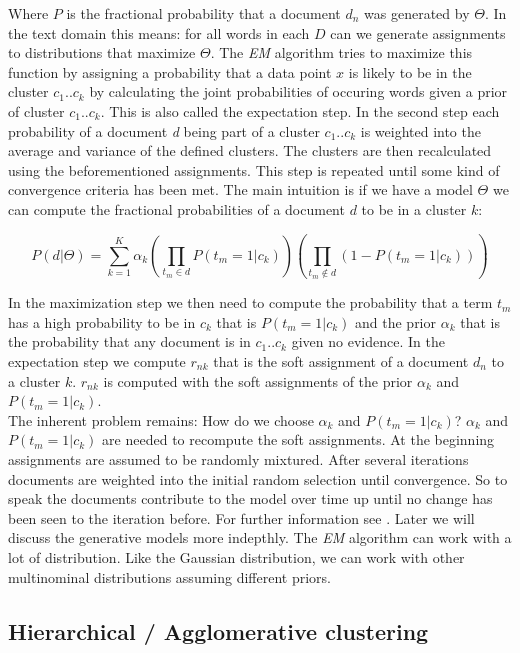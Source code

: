     Where $P$ is the fractional probability that a document $d_n$ was generated by $\Theta$. In the text domain this means: for all words in each $D$ can we generate assignments to distributions that maximize $\Theta$.
    The \emph{EM} algorithm tries to maximize this function by assigning a probability that a data point $x$ is likely to be in the cluster $c_1..c_k$ by calculating the joint probabilities of occuring words given a prior of cluster $c_1..c_k$. This is also called the expectation step. In the second step each probability of a document \emph{d} being part of a cluster $c_1..c_k$ is weighted into the average and variance of the defined clusters. The clusters are then recalculated using the beforementioned assignments. This step is repeated until some kind of convergence criteria has been met. The main intuition is if we have a model $\Theta$ we can compute the fractional probabilities of a document $d$ to be in a cluster $k$:

      \begin{equation}
        P(d|\Theta) = \sum_{k=1}^{K}\alpha_k\left ( \prod_{t_m \in d} P(t_m = 1|c_k) \right ) \left ( \prod_{t_m \not\in d} (1 - P(t_m = 1|c_k)) \right )
      \end{equation}

    In the maximization step we then need to compute the probability that a term $t_m$ has a high probability to be in $c_k$ that is $P(t_m = 1|c_k)$ and the prior $\alpha_k$ that is the probability that any document is in $c_1..c_k$ given no evidence. In the expectation step we compute $r_{nk}$ that is the soft assignment of a document $d_n$ to a cluster $k$. $r_{nk}$ is computed with the soft assignments of the prior $\alpha_k$ and $P(t_m = 1|c_k)$.\\
    The inherent problem remains: How do we choose $\alpha_k$ and $P(t_m = 1|c_k)$? $\alpha_k$ and $P(t_m = 1|c_k)$ are needed to recompute the soft assignments. At the beginning assignments are assumed to be randomly mixtured. After several iterations documents are weighted into the initial random selection until convergence. So to speak the documents contribute to the model over time up until no change has been seen to the iteration before. For further information see \cite{IRBookStanford2008}. Later we will discuss the generative models more indepthly. The \emph{EM} algorithm can work with a lot of distribution. Like the Gaussian distribution, we can work with other multinominal distributions assuming different priors.

  \subsection{Hierarchical / Agglomerative clustering}
  \label{sec:hierrachical}

